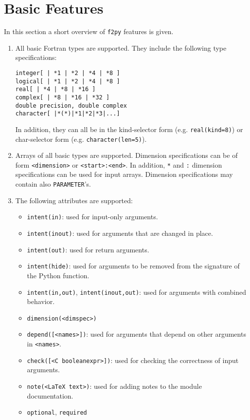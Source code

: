 \documentclass[twocolumn]{article}
\newcommand{\fpy}{\texttt{f2py}\xspace}
\begin{document}
\section{Basic Features}
\label{sec:features}

In this section a short overview of \fpy features is given.
\begin{enumerate}
\item All basic Fortran types are supported. They include 
the following type specifications:
\begin{verbatim}
integer[ | *1 | *2 | *4 | *8 ]
logical[ | *1 | *2 | *4 | *8 ]
real[ | *4 | *8 | *16 ]
complex[ | *8 | *16 | *32 ]
double precision, double complex
character[ |*(*)|*1|*2|*3|...]
\end{verbatim}
In addition, they can all be in the kind-selector form
(e.g. \texttt{real(kind=8)}) or char-selector form
(e.g. \texttt{character(len=5)}). 
\item Arrays of all basic types are supported. Dimension
  specifications can be of form \texttt{<dimension>} or
  \texttt{<start>:<end>}. In addition, \texttt{*} and \texttt{:}
  dimension specifications can be used for input arrays.
  Dimension specifications may contain also \texttt{PARAMETER}'s.
\item The following attributes are supported:
  \begin{itemize}
  \item
  \texttt{intent(in)}: used for input-only arguments.
  \item
  \texttt{intent(inout)}: used for arguments that are changed in
  place.
  \item
  \texttt{intent(out)}: used for return arguments.
  \item
  \texttt{intent(hide)}: used for arguments to be removed from
  the signature of the Python function.
  \item
  \texttt{intent(in,out)}, \texttt{intent(inout,out)}: used for
  arguments with combined behavior.
  \item
  \texttt{dimension(<dimspec>)}
  \item
  \texttt{depend([<names>])}: used
  for arguments that depend on other arguments in \texttt{<names>}.
  \item
  \texttt{check([<C booleanexpr>])}: used for checking the
  correctness of input arguments.
  \item
  \texttt{note(<LaTeX text>)}: used for
  adding notes to the module documentation.
  \item
    \texttt{optional}, \texttt{required}

\end{itemize}
\end{enumerate}
\end{document}
